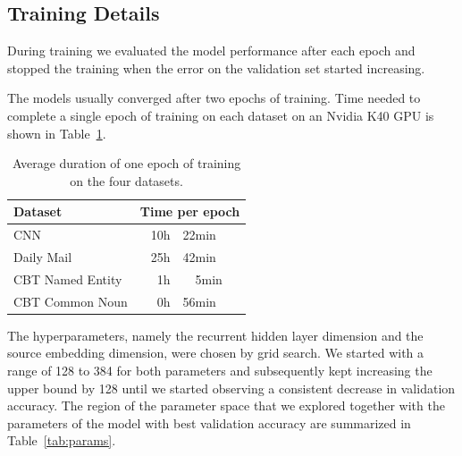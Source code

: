 \documentclass[11pt]{article}
\newcommand{\ONDRA}[1]{{\color{black}#1}}
\begin{document}
\newpage
\begin{appendices}

\section{Training Details}
\label{app:train}
During training we evaluated the model performance after each epoch and stopped the training when the error on the validation set started increasing. %

The models usually converged after two epochs of training. Time needed to complete a single epoch of training on each dataset on an Nvidia K40 GPU is shown in Table~\ref{tab:timing}.


\begin{table}[ht]
\centering
  \begin{tabular}{lr@{~}l}
    \toprule
    Dataset & \multicolumn{2}{l}{Time per epoch} \\
    
    \midrule
    
        CNN & 10h &22min \\
        Daily Mail & 25h &42min \\
        CBT Named Entity & ~1h & ~~5min \\
        CBT Common Noun & ~0h &56min \\ 
    
     \bottomrule
  \end{tabular}
  \caption{Average duration of one epoch of training on the four datasets.}
  \label{tab:timing}

\end{table}



\ONDRA{
The hyperparameters, namely the recurrent hidden layer dimension and the source embedding dimension, were chosen by grid search. We started with a range of 128 to 384 for both parameters and subsequently kept increasing the upper bound by 128 until we started observing a consistent decrease in validation accuracy. The region of the parameter space that we explored together with the parameters of the model with best validation accuracy are summarized in Table~\ref{tab:params}. 
}

\begin{table}[ht]
\centering
\end{table}
\end{appendices}
\end{document}
